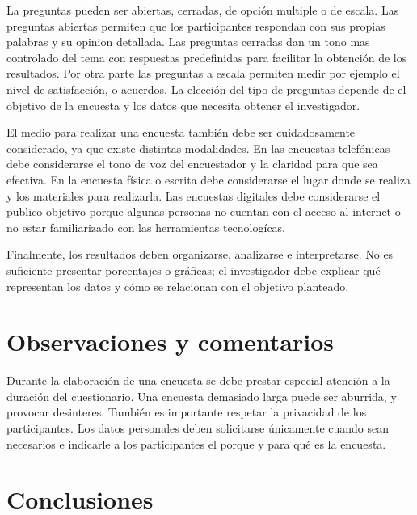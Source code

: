 \documentclass[12pt]{article}
\begin{document}
	La preguntas pueden ser abiertas, cerradas, de opción multiple o de escala.	Las preguntas abiertas permiten que los participantes respondan con sus propias palabras y su opinion detallada.	Las preguntas cerradas dan un tono mas controlado del tema con respuestas predefinidas para facilitar la obtención de los resultados.	Por otra parte las preguntas a escala permiten medir por ejemplo el nivel de satisfacción, o acuerdos. 	La elección del tipo de preguntas depende de el objetivo de la encuesta y los datos que necesita obtener el investigador.
	
	El medio para realizar una encuesta también debe ser cuidadosamente considerado, ya que existe distintas modalidades. En las encuestas telefónicas debe considerarse el tono de voz del encuestador y la claridad para que sea efectiva.	En la encuesta física o escrita debe considerarse el lugar donde se realiza y los materiales para realizarla. Las encuestas digitales debe considerarse el publico objetivo porque algunas personas no cuentan con el acceso al internet o no estar familiarizado con las herramientas tecnologícas.
	
	Finalmente, los resultados deben organizarse, analizarse e
	interpretarse. No es suficiente presentar porcentajes o gráficas; el
	investigador debe explicar qué representan los datos y cómo se
	relacionan con el objetivo planteado.
	
	\section*{Observaciones y comentarios}
	
	Durante la elaboración de una encuesta se debe prestar especial atención a la duración del cuestionario. Una encuesta demasiado larga puede ser aburrida, y provocar desinteres. También es importante respetar la privacidad de los participantes. Los datos personales deben solicitarse únicamente cuando sean necesarios e indicarle a los participantes el porque y para qué es la encuesta.
	
	\section*{Conclusiones}
	
\end{document}

